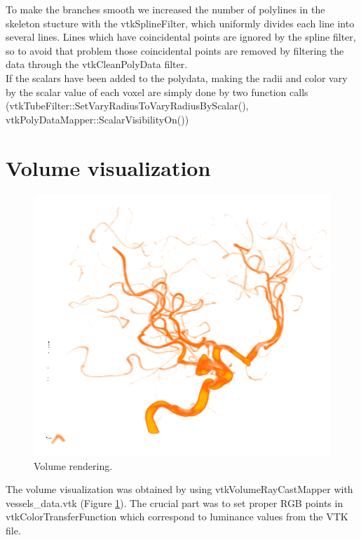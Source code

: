 To make the branches smooth we increased the number of polylines in the skeleton stucture with the vtkSplineFilter, which uniformly divides each line into several lines. Lines which have coincidental points are ignored by the spline filter, so to avoid that problem those coincidental points are removed by filtering the data through the vtkCleanPolyData filter. \\

If the scalars have been added to the polydata, making the radii and color vary by the scalar value of each voxel are simply done by two function calls (vtkTubeFilter::SetVaryRadiusToVaryRadiusByScalar(), vtkPolyDataMapper::ScalarVisibilityOn())

\section{Volume visualization}

\begin{figure}
	\centering
	\includegraphics[scale=0.4]{fig/volume-rendering}
	\caption{Volume rendering.}
	\label{fig:volume-rendering}
\end{figure}

The volume visualization was obtained by using vtkVolumeRayCastMapper with vessels\_data.vtk (Figure \ref{fig:volume-rendering}). The crucial part was to set proper RGB points in vtkColorTransferFunction which correspond to luminance values from the VTK file.

